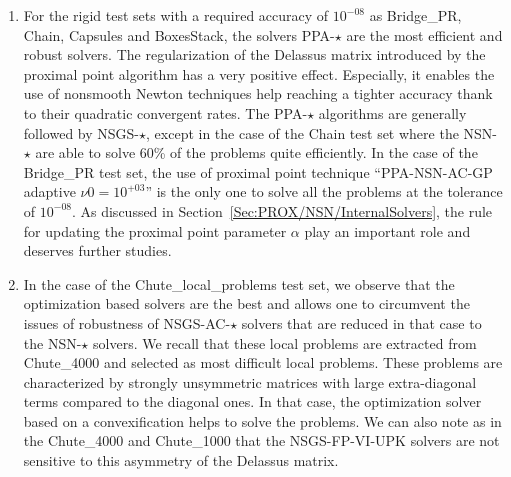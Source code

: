 \begin{enumerate}
\item For the rigid test sets with a required accuracy of $10^{-08}$ as Bridge\_PR, Chain, Capsules and BoxesStack, the solvers {\sf PPA-$\star$} are the most efficient and robust solvers. The regularization of the Delassus matrix  introduced by the proximal point algorithm has a very positive effect. Especially, it enables the use of nonsmooth Newton techniques help reaching a tighter accuracy thank to their quadratic convergent rates. The {\sf PPA-$\star$} algorithms are generally followed by {\sf NSGS-$\star$}, except in the case of the Chain test set where the  {\sf NSN-$\star$} are able to solve 60\% of the problems quite efficiently. In the case of the Bridge\_PR test set, the use of proximal point technique ``{\sf PPA-NSN-AC-GP adaptive $\nu0 = 10^{+03}$}'' is the only one  to solve all the problems at the tolerance of  $10^{-08}$. As discussed in Section~\ref{Sec:PROX/NSN/InternalSolvers}, the rule for updating the proximal point parameter $\alpha$ play an important role and deserves further studies.
  
\item In the case of the Chute\_local\_problems test set, we observe that the optimization based solvers are the best and allows one to circumvent the issues of robustness of {\sf NSGS-AC-$\star$} solvers that are reduced in that case to the {\sf NSN-$\star$} solvers. We recall that these local problems are extracted from Chute\_4000 and selected as most difficult local problems. These problems are characterized by strongly unsymmetric matrices with large extra-diagonal terms compared to the diagonal ones. In that case, the optimization solver based on a convexification helps to solve the problems. We can also note as in the Chute\_4000 and Chute\_1000 that  the {\sf NSGS-FP-VI-UPK} solvers are not sensitive to this asymmetry of the Delassus matrix.
 \end{enumerate}


